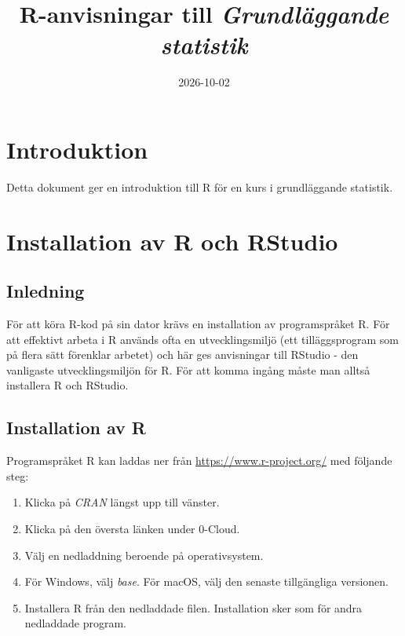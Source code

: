 \documentclass[
]{book}
\title{R-anvisningar till \emph{Grundläggande statistik}}
\author{}
\date{\vspace{-2.5em}2026-10-02}
\providecommand{\tightlist}{%
  \setlength{\itemsep}{0pt}\setlength{\parskip}{0pt}}
\theoremstyle{definition}
\theoremstyle{definition}
\theoremstyle{definition}
\theoremstyle{definition}
\theoremstyle{remark}
\begin{document}
\maketitle

{
\setcounter{tocdepth}{1}
\tableofcontents
}
\chapter*{Introduktion}\label{introduktion}

Detta dokument ger en introduktion till R för en kurs i grundläggande statistik.

\chapter*{Installation av R och RStudio}\label{installation-av-r-och-rstudio}

\section{Inledning}\label{inledning}

För att köra R-kod på sin dator krävs en installation av programspråket R. För att effektivt arbeta i R används ofta en utvecklingsmiljö (ett tilläggsprogram som på flera sätt förenklar arbetet) och här ges anvisningar till RStudio - den vanligaste utvecklingsmiljön för R. För att komma ingång måste man alltså installera R och RStudio.

\section{Installation av R}\label{installation-av-r}

Programspråket R kan laddas ner från \url{https://www.r-project.org/} med följande steg:

\begin{enumerate}
\def\labelenumi{\arabic{enumi}.}
\tightlist
\item
  Klicka på \emph{CRAN} längst upp till vänster.
\item
  Klicka på den översta länken under 0-Cloud.
\item
  Välj en nedladdning beroende på operativsystem.
\item
  För Windows, välj \emph{base}. För macOS, välj den senaste tillgängliga versionen.
\item
  Installera R från den nedladdade filen. Installation sker som för andra nedladdade program.
\end{enumerate}
\end{document}
